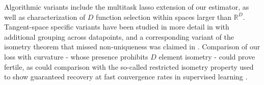 Algorithmic variants include the multitask lasso \cite{ Hastie2015-qa} extension of our estimator, as well as characterization of $D$ function selection within spaces larger than $\mathbb R^D$.
Tangent-space specific variants have been studied in more detail in \cite{Koelle2022-ju, Koelle2024-no} with additional grouping across datapoints, and a corresponding variant of the isometry theorem that missed non-uniqueness was claimed in \cite{Koelle2022-lp}.
Comparison of our loss with curvature - whose presence prohibits $D$ element isometry - could prove fertile, as could comparison with the so-called restricted isometry property used to show guaranteed recovery at fast convergence rates in supervised learning \cite{Candes2005-dd, Hastie2015-qa}.